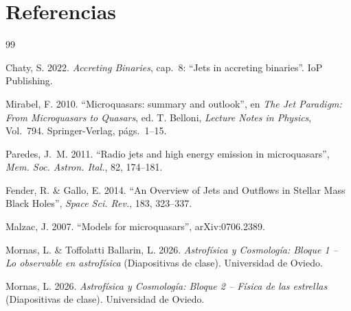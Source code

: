 \documentclass[twoside, 11pt]{article}
\begin{document}
\newpage
{\color{white}\section{Referencias}}
\vspace{-2em}
\begin{thebibliography}{99}

Chaty, S. 2022. \textit{Accreting Binaries}, cap.~8: ``Jets in accreting binaries''. IoP Publishing.

Mirabel, F. 2010. ``Microquasars: summary and outlook'', en \textit{The Jet Paradigm: From Microquasars to Quasars}, ed. T. Belloni, \textit{Lecture Notes in Physics}, Vol.~794. Springer-Verlag, págs.~1--15.

Paredes, J.~M. 2011. ``Radio jets and high energy emission in microquasars'', \textit{Mem. Soc. Astron. Ital.}, 82, 174--181.

Fender, R. \& Gallo, E. 2014. ``An Overview of Jets and Outflows in Stellar Mass Black Holes'', \textit{Space Sci. Rev.}, 183, 323--337.

Malzac, J. 2007. ``Models for microquasars'', arXiv:0706.2389.

Mornas, L. \& Toffolatti Ballarin, L. 2026. \textit{Astrofísica y Cosmología: Bloque 1 -- Lo observable en astrofísica} (Diapositivas de clase). Universidad de Oviedo.

Mornas, L. 2026. \textit{Astrofísica y Cosmología: Bloque 2 -- Física de las estrellas} (Diapositivas de clase). Universidad de Oviedo.

\end{thebibliography}
\end{document}

